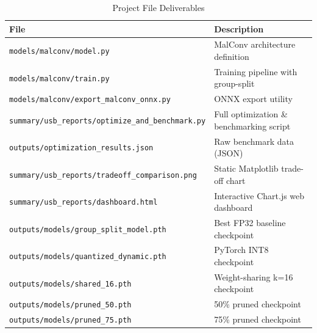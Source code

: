 \documentclass[12pt,a4paper]{article}
\begin{document}
\begin{table}[h!]
\centering
\caption{Project File Deliverables}
\renewcommand{\arraystretch}{1.3}
\begin{tabular}{L{5.5cm} L{8cm}}
\toprule
{}
\color{white}\textbf{File} & \color{white}\textbf{Description} \\
\midrule
\texttt{models/malconv/model.py} & MalConv architecture definition \\
\texttt{models/malconv/train.py} & Training pipeline with group-split \\
\texttt{models/malconv/export\_malconv\_onnx.py} & ONNX export utility \\
\texttt{summary/usb\_reports/optimize\_and\_benchmark.py} & Full optimization \& benchmarking script \\
\texttt{outputs/optimization\_results.json} & Raw benchmark data (JSON) \\
\texttt{summary/usb\_reports/tradeoff\_comparison.png} & Static Matplotlib trade-off chart \\
\texttt{summary/usb\_reports/dashboard.html} & Interactive Chart.js web dashboard \\
\texttt{outputs/models/group\_split\_model.pth} & Best FP32 baseline checkpoint \\
\texttt{outputs/models/quantized\_dynamic.pth} & PyTorch INT8 checkpoint \\
\texttt{outputs/models/shared\_16.pth} & Weight-sharing k=16 checkpoint \\
\texttt{outputs/models/pruned\_50.pth} & 50\% pruned checkpoint \\
\texttt{outputs/models/pruned\_75.pth} & 75\% pruned checkpoint \\
\bottomrule
\end{tabular}
\end{table}
\end{document}
